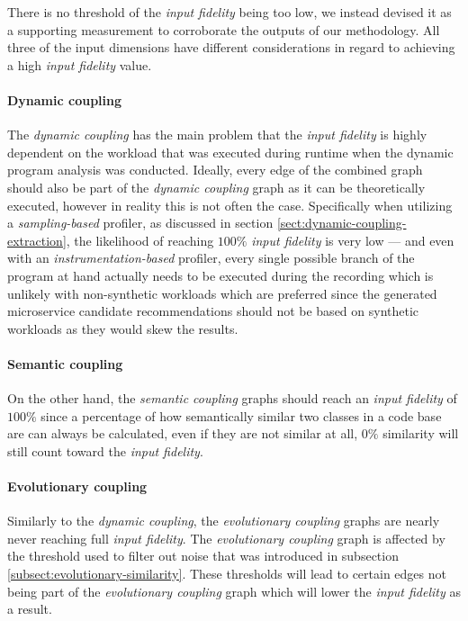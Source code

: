 \documentclass[12pt,a4paper]{report}
\begin{document}
There is no threshold of the \textit{input fidelity} being too low,
we instead devised it as a supporting measurement to corroborate the outputs
of our methodology. All three of the input dimensions have different
considerations in regard to achieving a high \textit{input fidelity} value.

\paragraph{Dynamic coupling}
The \textit{dynamic coupling} has the main problem that the \textit{input fidelity}
is highly dependent on the workload that was executed during runtime when the
dynamic program analysis was conducted. Ideally, every edge of the combined graph
should also be part of the \textit{dynamic coupling} graph as it can be
theoretically executed, however in reality this is not often the case.
Specifically when utilizing a \textit{sampling\hyp based} profiler,
as discussed in section \ref{sect:dynamic-coupling-extraction},
the likelihood of reaching \(100\%\) \textit{input fidelity} is very low ---
and even with an \textit{instrumentation\hyp based} profiler,
every single possible branch of the program at hand actually needs to be
executed during the recording which is unlikely with non\hyp synthetic workloads
which are preferred since the generated microservice candidate recommendations
should not be based on synthetic workloads as they would skew the results.

\paragraph{Semantic coupling}
On the other hand, the \textit{semantic coupling} graphs should reach an
\textit{input fidelity} of \(100\%\) since a percentage of how semantically
similar two classes in a code base are can always be calculated,
even if they are not similar at all, \(0\%\) similarity will still
count toward the \textit{input fidelity}.

\paragraph{Evolutionary coupling}
Similarly to the \textit{dynamic coupling}, the \textit{evolutionary coupling}
graphs are nearly never reaching full \textit{input fidelity}.
The \textit{evolutionary coupling} graph is affected by the threshold used
to filter out noise that was introduced in subsection \ref{subsect:evolutionary-similarity}.
These thresholds will lead to certain edges not being part of the
\textit{evolutionary coupling} graph which will lower the \textit{input fidelity}
as a result.
\end{document}
